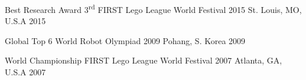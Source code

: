 



\begin{cvhonors}

  \cvhonor
    {Best Research Award 3\textsuperscript{rd}} %
    {FIRST Lego League World Festival 2015} %
    {St. Louis, MO, U.S.A} %
    {2015} %

  \cvhonor
    {Global Top 6} %
    {World Robot Olympiad 2009} %
    {Pohang, S. Korea} %
    {2009} %
    
  \cvhonor
    {World Championship} %
    {FIRST Lego League World Festival 2007} %
    {Atlanta, GA, U.S.A} %
    {2007} %

\end{cvhonors}




